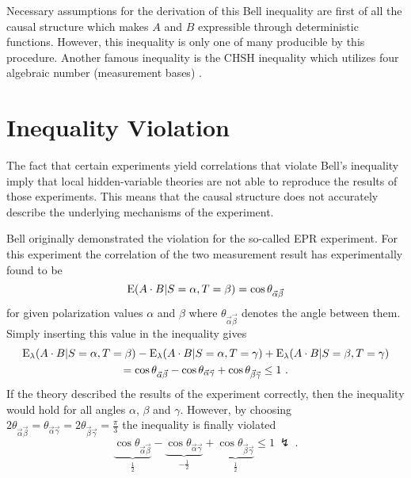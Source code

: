 Necessary assumptions for the derivation of this Bell inequality are first of all the causal structure which makes $A$ and $B$ expressible through deterministic functions.
However, this inequality is only one of many producible by this procedure.
Another famous inequality is the \ac{CHSH} inequality which utilizes four algebraic number (measurement bases) \cite{Clauser.1969,Peters.2017}.

\section{Inequality Violation}
\label{Basics:InequalityViolation}

The fact that certain experiments yield correlations that violate Bell's inequality imply that local hidden-variable theories are not able to reproduce the results of those experiments.
This means that the causal structure does not accurately describe the underlying mechanisms of the experiment.

Bell originally demonstrated \cite{Bell.1964} the violation for the so-called \ac{EPR} experiment.
For this experiment the correlation of the two measurement result has experimentally found to be \begin{equation}
\label{eq:EPRCorrelation}
\mathrm{E}(A\cdot B|S=\alpha,T=\beta)=\cos\theta_{\vec\alpha\vec\beta}
\end{equation}
for given polarization values $\alpha$ and $\beta$ where $\theta_{\vec\alpha\vec\beta}$ denotes the angle between them.
Simply inserting this value in the inequality gives
\begin{multline}
\mathrm{E}_\lambda(A\cdot B|S=\alpha,T=\beta)
-\mathrm{E}_\lambda(A\cdot B|S=\alpha,T=\gamma)
+\mathrm{E}_\lambda(A\cdot B|S=\beta,T=\gamma)
\\
=\cos\theta_{\vec\alpha\vec\beta}
-\cos\theta_{\vec\alpha\vec\gamma}
+\cos\theta_{\vec\beta\vec\gamma}
\leq1
\ .
\end{multline}
If the theory described the results of the experiment correctly, then the inequality would hold for all angles $\alpha$, $\beta$ and $\gamma$.
However, by choosing $2\theta_{\vec\alpha\vec\beta}=\theta_{\vec\alpha\vec\gamma}=2\theta_{\vec\beta\vec\gamma}=\frac{\pi}{3}$ the inequality is finally violated
\begin{equation}
\underbrace{\cos\theta_{\vec\alpha\vec\beta}}_{\frac{1}{2}}
-\underbrace{\cos\theta_{\vec\alpha\vec\gamma}}_{-\frac{1}{2}}
+\underbrace{\cos\theta_{\vec\beta\vec\gamma}}_{\frac{1}{2}}
\leq1
\ \lightning
\ .
\end{equation}

